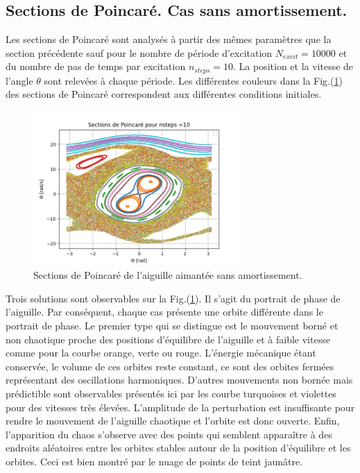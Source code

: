 \documentclass[a4paper,12pt,twoside]{article}
\begin{document}
\vspace{-0.5cm}

\subsection{Sections de Poincaré. Cas sans amortissement.}  \label{sec3.4}

\vspace{-0.3cm}

Les sections de Poincaré sont analysés à partir des mêmes paramètres que la section précédente sauf pour le nombre de période d'excitation $N_{excit}=10000$ et du nombre de pas de temps par excitation $n_{steps}=10$. La position et la vitesse de l'angle $\theta$ sont relevées à chaque période. Les différentes couleurs dans la Fig.(\ref{fig6}) des sections de Poincaré correspondent aux différentes conditions initiales.

\vspace{-0.3cm}

\begin{figure}[H]
    \centering
    \includegraphics[width=0.7\textwidth]{graphes/question_3.png}
    \captionsetup{justification=centering}
    \caption{Sections de Poincaré de l'aiguille aimantée sans amortissement.}
    \label{fig6}
\end{figure}

\vspace{-0.4cm}

Trois solutions sont observables sur la Fig.(\ref{fig6}). Il s'agit du portrait de phase de l'aiguille. Par conséquent, chaque cas présente une orbite différente dans le portrait de phase. Le premier type qui se distingue est le mouvement borné et non chaotique proche des positions d'équilibre de l'aiguille et à faible vitesse comme pour la courbe orange, verte ou rouge. L'énergie mécanique étant conservée, le volume de ces orbites reste constant, ce sont des orbites fermées représentant des oscillations harmoniques. D'autres mouvements non bornée mais prédictible sont observables présentés ici par les courbe turquoises et violettes pour des vitesses très élevées. L'amplitude de la perturbation est insuffisante pour rendre le mouvement de l'aiguille chaotique et l'orbite est donc ouverte. Enfin, l'apparition du chaos s'observe avec des points qui semblent apparaître à des endroits aléatoires entre les orbites stables autour de la position d'équilibre et les orbites. Ceci est bien montré par le nuage de points de teint jaunâtre.
\end{document}
